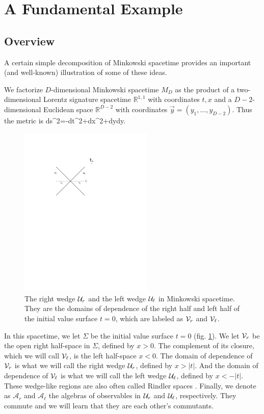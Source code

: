 \documentclass[12pt]{article}
\def\Bbb{\mathbb}
\def\R{{\Bbb{R}}}\def\Z{{\Bbb{Z}}}
\numberwithin{equation}{section}
\def\d{\mathrm d}
\def\Z{{\Bbb Z}}
\def\A{{\mathcal A}}
\begin{document}
\section{A Fundamental Example}\label{more}

\subsection{Overview}\label{preover}

A certain simple decomposition of Minkowski spacetime provides an important (and well-known) illustration of
some of these ideas.

We factorize $D$-dimensional Minkowski spacetime $M_D$ as the product of a two-dimensional Lorentz signature spacetime $\R^{1,1}$ with
coordinates $t,x$ and a $D-2$-dimensional
Euclidean space $\R^{D-2}$ with coordinates $\vec y=(y_1,\dots,y_{D-2})$.  Thus the metric is
\be\label{mozzo} \d s^2=-\d t^2+\d x^2+\d\vec y\cdot \d\vec y. \ee

\begin{figure}
 \begin{center}
   \includegraphics[width=2.5in]{Fig2.pdf}
 \end{center}
\caption{\small  The right wedge ${\mathcal U}_r$ and the left wedge ${\mathcal U}_\ell$ in Minkowski spacetime.  
They are the domains of dependence of the right half and left half of the initial value surface $t=0$, which are labeled as ${\mathcal V}_r$ and ${\mathcal V}_\ell$.
\label{Fig2}}
\end{figure}


In this spacetime, we let $\Sigma$ be the initial value surface $t=0$ (fig. \ref{Fig2}).  
We let ${\mathcal V}_r$ be the open right half-space in $\Sigma$, defined
by $x>0$.  The complement of its closure, which we will call ${\mathcal V}_\ell$, is the left half-space $x<0$.  The domain of dependence of
${\mathcal V}_r$ is what we will call the right wedge ${\mathcal U}_r$, defined by $x>|t|$.   And the domain of dependence of
${\mathcal V}_\ell$ is what we will call the left wedge ${\mathcal U}_\ell$, defined by $x<-|t|$.    These wedge-like regions are also often called Rindler spaces \cite{Rindler}.
 Finally, we denote as $\A_r$ and $\A_\ell$ the algebras of observables in ${\mathcal U}_r$ and ${\mathcal U}_\ell$,
respectively.    They commute and we will learn that they are each other's commutants.
\end{document}
